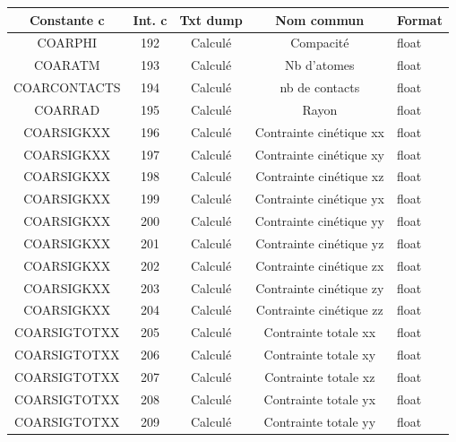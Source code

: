 \documentclass[a4paper,12pt]{article}
\begin{document}
{{{\begin{table}
\begin{minipage}{\linewidth}
\renewcommand{\footnoterule}{}
\renewcommand{\thefootnote}{\alph{footnote}}
\begin{tabular}{|c|c|c|c|l|} \hline
  \textbf{Constante c} & \textbf{Int. c} & \textbf{Txt dump} & \textbf{Nom commun} & \textbf{Format} \\ \hline
   \color{blue} COARPHI & 192 & Calcul\'e & Compacit\'e & float \\ \hline
   \color{blue}COARATM & 193 & Calcul\'e & Nb d'atomes & float \\ \hline
   \color{blue}COARCONTACTS & 194 & Calcul\'e & nb de contacts  & float \\ \hline
   \color{blue}COARRAD & 195 & Calcul\'e & Rayon & float \\ \hline
   \color{blue}COARSIGKXX & 196 & Calcul\'e & Contrainte cin\'etique xx & float \\ \hline
   \color{blue}COARSIGKXX & 197 & Calcul\'e & Contrainte cin\'etique xy & float \\ \hline
   \color{blue}COARSIGKXX & 198 & Calcul\'e & Contrainte cin\'etique xz & float \\ \hline
   \color{blue}COARSIGKXX & 199 & Calcul\'e & Contrainte cin\'etique yx & float \\ \hline
   \color{blue}COARSIGKXX & 200 & Calcul\'e & Contrainte cin\'etique yy & float \\ \hline
   \color{blue}COARSIGKXX & 201 & Calcul\'e & Contrainte cin\'etique yz & float \\ \hline
   \color{blue}COARSIGKXX & 202 & Calcul\'e & Contrainte cin\'etique zx & float \\ \hline
   \color{blue}COARSIGKXX & 203 & Calcul\'e & Contrainte cin\'etique zy & float \\ \hline
   \color{blue}COARSIGKXX & 204 & Calcul\'e & Contrainte cin\'etique zz & float \\ \hline
   \color{blue}COARSIGTOTXX & 205 & Calcul\'e & Contrainte totale xx & float \\ \hline
   \color{blue}COARSIGTOTXX & 206 & Calcul\'e & Contrainte totale xy & float \\ \hline 
   \color{blue}COARSIGTOTXX & 207 & Calcul\'e & Contrainte totale xz & float \\ \hline
   \color{blue}COARSIGTOTXX & 208 & Calcul\'e & Contrainte totale yx & float \\ \hline
   \color{blue}COARSIGTOTXX & 209 & Calcul\'e & Contrainte totale yy &float \\ \hline

\end{tabular}
\end{minipage}
\end{table}}}}
\end{document}
